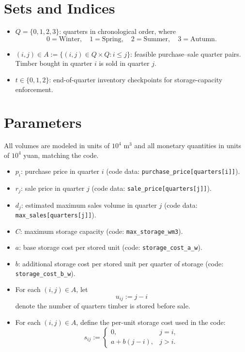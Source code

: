 \section*{Sets and Indices}

\begin{itemize}
    \item $Q = \{0,1,2,3\}$: quarters in chronological order, where
    \[
    0=\text{Winter},\quad 1=\text{Spring},\quad 2=\text{Summer},\quad 3=\text{Autumn}.
    \]
    \item $(i,j) \in A := \{(i,j)\in Q\times Q : i \le j\}$: feasible purchase--sale quarter pairs. Timber bought in quarter $i$ is sold in quarter $j$.
    \item $t \in \{0,1,2\}$: end-of-quarter inventory checkpoints for storage-capacity enforcement.
\end{itemize}

\section*{Parameters}

All volumes are modeled in units of $10^4\text{ m}^3$ and all monetary quantities in units of $10^4$ yuan, matching the code.

\begin{itemize}
    \item $p_i$: purchase price in quarter $i$ (code data: \texttt{purchase\_price[quarters[i]]}).
    \item $r_j$: sale price in quarter $j$ (code data: \texttt{sale\_price[quarters[j]]}).
    \item $d_j$: estimated maximum sales volume in quarter $j$ (code data: \texttt{max\_sales[quarters[j]]}).
    \item $C$: maximum storage capacity (code: \texttt{max\_storage\_wm3}).
    \item $a$: base storage cost per stored unit (code: \texttt{storage\_cost\_a\_w}).
    \item $b$: additional storage cost per stored unit per quarter of storage (code: \texttt{storage\_cost\_b\_w}).
    \item For each $(i,j)\in A$, let
    \[
    u_{ij} := j-i
    \]
    denote the number of quarters timber is stored before sale.
    \item For each $(i,j)\in A$, define the per-unit storage cost used in the code:
    \[
    s_{ij} :=
    \begin{cases}
    0, & j=i,\\
    a + b(j-i), & j>i.
    \end{cases}
    \]
\end{itemize}

